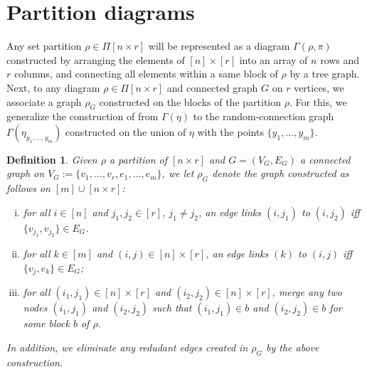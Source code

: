 \documentclass[12pt]{article}
\newcommand{\R}{\mathbb{R}}
\newtheorem{definition}[prop]{Definition}
\numberwithin{equation}{section}
\begin{document}
\section{Partition diagrams}
\noindent 
Any set partition $\rho\in\Pi[n\times r]$
will be represented as a diagram
 $\Gamma (\rho,\pi )$ 
 constructed by 
 arranging the elements of $[n] \times [r]$
 into an %
 array of $n$ rows and $r$ columns, and
 connecting all elements within a same block of $\rho$ 
 by a tree graph. 
 Next, to any diagram $\rho\in\Pi[n\times r]$ 
 and connected graph $G$ on $r$ vertices, we associate a graph $\rho_G$
 constructed on the blocks of the partition $\rho$. 
For this, we generalize the construction
of \cite{LiuPrivault} from $\Gamma(\eta)$ to
 the random-connection
graph $\Gamma(\eta_{y_1, \ldots ,y_m})$ constructed on the union of $\eta$ with the points
$\{ y_1, \ldots ,y_m\}$.
 \begin{definition}
   \label{fjklf}
   Given $\rho$ a partition of $[n\times r]$
   and $G=(V_G,E_G)$ a connected graph 
   on $V_G:=\{v_1, \ldots ,v_r, e_1,\ldots , e_m\}$, 
   we let $\rho_G$ denote the graph %
   constructed as follows on $[m] \cup [n\times r]$:
\begin{enumerate}[i)]  
\item for all $i\in [n]$
  and $j_1, j_2\in [r]$, $j_1\not= j_2$,  
  an edge links $(i,j_1)$ to $(i,j_2)$
  iff $\{v_{j_1},v_{j_2}\}\in E_G$. 
\item for all
  $k\in [m]$
  and 
  $(i,j)\in [n]\times [r]$, an edge
  links $(k)$ to $(i,j)$ iff $\{v_j,e_k\}\in E_G$; 
\item for all $(i_1,j_1)\in [n]\times [r]$
  and $(i_2,j_2) \in [n]\times [r]$,
  merge any two nodes $(i_1,j_1)$ and $(i_2,j_2)$ 
  such that $(i_1,j_1)\in b$ and $(i_2,j_2)\in b$ for some block $b$
  of $\rho$. 
\end{enumerate}
In addition, we eliminate any redudant edges
created in $\rho_G$ by the above construction.
 \end{definition}
\end{document}
